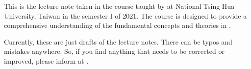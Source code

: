 \begin{myminipage} 
     This is the lecture note taken in the course \textit{\courseloc} taught by \profloc{} at 
     National Tsing Hua University, Taiwan in the semester I of 2021.
     The course is designed to provide a comprehensive understanding of the fundamental concepts and theories in \courseloc{}.

     Currently, these are just drafts of the lecture notes. There can be typos and mistakes anywhere.
     So, if you find anything that needs to be corrected or improved, please inform at \myemailloc. \bigskip
\end{myminipage}
